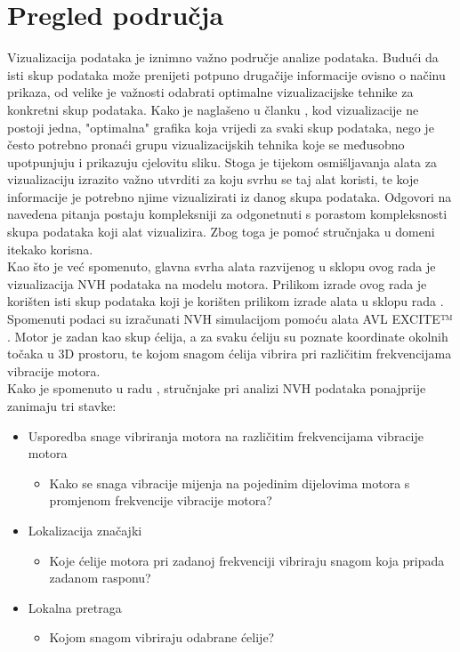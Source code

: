 \documentclass[times, utf8, diplomski]{fer}
\begin{document}
\chapter{Pregled područja}
Vizualizacija podataka je iznimno važno područje analize podataka. Budući da isti skup podataka može prenijeti potpuno drugačije informacije ovisno o načinu prikaza, od velike je važnosti odabrati optimalne vizualizacijske tehnike za konkretni skup podataka. Kako je naglašeno u članku \citep{Unwin2020Why}, kod vizualizacije ne postoji jedna, "optimalna" grafika koja vrijedi za svaki skup podataka, nego je često potrebno pronaći grupu vizualizacijskih tehnika koje se međusobno upotpunjuju i prikazuju cjelovitu sliku. Stoga je tijekom osmišljavanja alata za vizualizaciju izrazito važno utvrditi za koju svrhu se taj alat koristi, te koje informacije je potrebno njime vizualizirati iz danog skupa podataka. Odgovori na navedena pitanja postaju kompleksniji za odgonetnuti s porastom kompleksnosti skupa podataka koji alat vizualizira. Zbog toga je pomoć stručnjaka u domeni itekako korisna.\\

Kao što je već spomenuto, glavna svrha alata razvijenog u sklopu ovog rada je vizualizacija NVH podataka na modelu motora. Prilikom izrade ovog rada je korišten isti skup podataka koji je korišten prilikom izrade alata u sklopu rada \citep{matkovic2021getting}. Spomenuti podaci su izračunati NVH simulacijom pomoću alata AVL EXCITE™ \citep{avlEXCITE}. Motor je zadan kao skup ćelija, a za svaku ćeliju su poznate koordinate okolnih točaka u 3D prostoru, te kojom snagom ćelija vibrira pri različitim frekvencijama vibracije motora.\\

Kako je spomenuto u radu \citep{matkovic2021getting}, stručnjake pri analizi NVH podataka ponajprije zanimaju tri stavke:

\begin{itemize}
\item Usporedba snage vibriranja motora na različitim frekvencijama vibracije motora
	\begin{itemize}
	\item Kako se snaga vibracije mijenja na pojedinim dijelovima motora s promjenom frekvencije vibracije motora?
	\end{itemize} 
\item Lokalizacija značajki
	\begin{itemize}
	\item Koje ćelije motora pri zadanoj frekvenciji vibriraju snagom koja pripada zadanom rasponu?
	\end{itemize} 
\item Lokalna pretraga
	\begin{itemize}
	\item Kojom snagom vibriraju odabrane ćelije?\\
	\end{itemize} 
\end{itemize}
\end{document}

